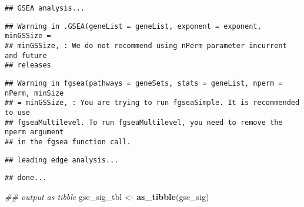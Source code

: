 \documentclass[
]{article}
\newenvironment{Shaded}{\begin{snugshade}}{\end{snugshade}}
\newcommand{\CommentTok}[1]{\textcolor[rgb]{0.56,0.35,0.01}{\textit{#1}}}
\newcommand{\DataTypeTok}[1]{\textcolor[rgb]{0.13,0.29,0.53}{#1}}
\newcommand{\DecValTok}[1]{\textcolor[rgb]{0.00,0.00,0.81}{#1}}
\newcommand{\KeywordTok}[1]{\textcolor[rgb]{0.13,0.29,0.53}{\textbf{#1}}}
\newcommand{\NormalTok}[1]{#1}
\newcommand{\OperatorTok}[1]{\textcolor[rgb]{0.81,0.36,0.00}{\textbf{#1}}}
\newcommand{\StringTok}[1]{\textcolor[rgb]{0.31,0.60,0.02}{#1}}
\begin{document}
\begin{verbatim}
## GSEA analysis...
\end{verbatim}

\begin{verbatim}
## Warning in .GSEA(geneList = geneList, exponent = exponent, minGSSize =
## minGSSize, : We do not recommend using nPerm parameter incurrent and future
## releases
\end{verbatim}

\begin{verbatim}
## Warning in fgsea(pathways = geneSets, stats = geneList, nperm = nPerm, minSize
## = minGSSize, : You are trying to run fgseaSimple. It is recommended to use
## fgseaMultilevel. To run fgseaMultilevel, you need to remove the nperm argument
## in the fgsea function call.
\end{verbatim}

\begin{verbatim}
## leading edge analysis...
\end{verbatim}

\begin{verbatim}
## done...
\end{verbatim}

\begin{Shaded}
\begin{Highlighting}[]
\CommentTok{## output as tibble}
\NormalTok{gse_sig_tbl <-}\StringTok{ }\KeywordTok{as_tibble}\NormalTok{(gse_sig)}
\end{Highlighting}
\end{Shaded}

\begin{Shaded}
\end{Shaded}
\end{document}
